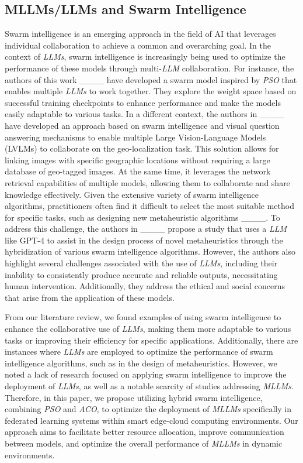 \subsection{MLLMs/LLMs and Swarm Intelligence}
Swarm intelligence is an emerging approach in the field of AI that leverages individual collaboration to achieve a common and overarching goal. In the context of \textit{LLMs}, swarm intelligence is increasingly being used to optimize the performance of these models through multi-\textit{LLM} collaboration. For instance, the authors of this work ____ have developed a swarm model inspired by \textit{PSO} that enables multiple \textit{LLMs} to work together. They explore the weight space based on successful training checkpoints to enhance performance and make the models easily adaptable to various tasks.
In a different context, the authors in ____ have developed an approach based on swarm intelligence and visual question answering mechanisms to enable multiple Large Vision-Language Models (LVLMs) to collaborate on the geo-localization task. This solution allows for linking images with specific geographic locations without requiring a large database of geo-tagged images. At the same time, it leverages the network retrieval capabilities of multiple models, allowing them to collaborate and share knowledge effectively.
Given the extensive variety of swarm intelligence algorithms, practitioners often find it difficult to select the most suitable method for specific tasks, such as designing new metaheuristic algorithms ____. To address this challenge, the authors in ____ propose a study that uses a \textit{LLM} like GPT-4 to assist in the design process of novel metaheuristics through the hybridization of various swarm intelligence algorithms. However, the authors also highlight several challenges associated with the use of \textit{LLMs}, including their inability to consistently produce accurate and reliable outputs, necessitating human intervention. Additionally, they address the ethical and social concerns that arise from the application of these models.

From our literature review, we found examples of using swarm intelligence to enhance the collaborative use of \textit{LLMs}, making them more adaptable to various tasks or improving their efficiency for specific applications. Additionally, there are instances where \textit{LLMs} are employed to optimize the performance of swarm intelligence algorithms, such as in the design of metaheuristics. However, we noted a lack of research focused on applying swarm intelligence to improve the deployment of \textit{LLMs}, as well as a notable scarcity of studies addressing \textit{MLLMs}. Therefore, in this paper, we propose utilizing hybrid swarm intelligence, combining \textit{PSO} and \textit{ACO}, to optimize the deployment of \textit{MLLMs} specifically in federated learning systems within smart edge-cloud computing environments. Our approach aims to facilitate better resource allocation, improve communication between models, and optimize the overall performance of \textit{MLLMs} in dynamic environments.